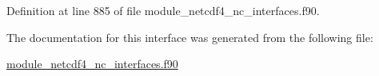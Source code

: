 Definition at line 885 of file module\+\_\+netcdf4\+\_\+nc\+\_\+interfaces.\+f90.



The documentation for this interface was generated from the following file\+:\begin{DoxyCompactItemize}
\item 
\hyperlink{module__netcdf4__nc__interfaces_8f90}{module\+\_\+netcdf4\+\_\+nc\+\_\+interfaces.\+f90}\end{DoxyCompactItemize}
